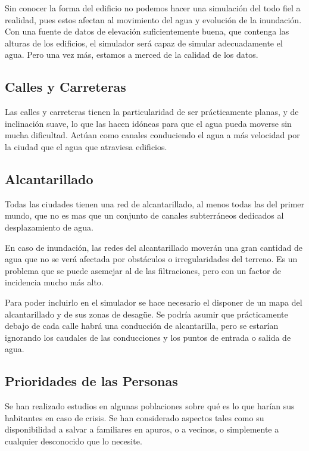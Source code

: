 Sin conocer la forma del edificio no podemos hacer una simulación del todo fiel
a realidad, pues estos afectan al movimiento del agua y evolución de la
inundación. Con una fuente de datos de elevación suficientemente buena, que
contenga las alturas de los edificios, el simulador será capaz de simular
adecuadamente el agua. Pero una vez más, estamos a merced de la calidad de los
datos.

\subsection*{Calles y Carreteras}

Las calles y carreteras tienen la particularidad de ser prácticamente planas, y
de inclinación suave, lo que las hacen idóneas para que el agua pueda moverse
sin mucha dificultad. Actúan como canales conduciendo el agua a más velocidad
por la ciudad que el agua que atraviesa edificios.

\subsection*{Alcantarillado}

Todas las ciudades tienen una red de alcantarillado, al menos todas las del
primer mundo, que no es mas que un conjunto de canales subterráneos dedicados
al desplazamiento de agua.

En caso de inundación, las redes del alcantarillado moverán una gran cantidad de
agua que no se verá afectada por obstáculos o irregularidades del terreno. Es un
problema que se puede asemejar al de las filtraciones, pero con un factor de
incidencia mucho más alto.

Para poder incluirlo en el simulador se hace necesario el disponer de un mapa
del alcantarillado y de sus zonas de desagüe. Se podría asumir que prácticamente
debajo de cada calle habrá una conducción de alcantarilla, pero se estarían
ignorando los caudales de las conducciones y los puntos de entrada o salida de
agua.

\subsection*{Prioridades de las Personas}

Se han realizado estudios\cite{Liu07} en algunas poblaciones sobre qué es
lo que harían sus habitantes en caso de crisis. Se han considerado aspectos
tales como su disponibilidad a salvar a familiares en apuros, o a vecinos, o
simplemente a cualquier desconocido que lo necesite.

